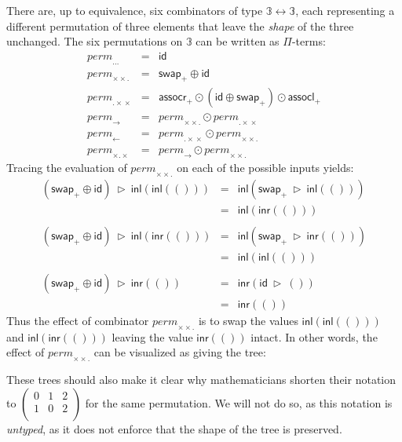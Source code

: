\documentclass[a4paper,USenglish]{lipics-v2016-utf8x}
\newcommand{\iso}{\leftrightarrow}
\newcommand{\inl}[1]{\textsf{inl}(#1)}
\newcommand{\inr}[1]{\textsf{inr}(#1)}
\newcommand{\permone}{\mathit{perm}_{...}}
\newcommand{\permtwo}{\mathit{perm}_{\times\!\times.}}
\newcommand{\permthree}{\mathit{perm}_{.\times\!\times}}
\newcommand{\permfour}{\mathit{perm}_{\rightarrow}}
\newcommand{\permfive}{\mathit{perm}_{\leftarrow}}
\newcommand{\permsix}{\mathit{perm}_{\times.\times}}
\newcommand{\evalone}[2]{#1~\triangleright~#2}
\newcommand{\unitv}{()}
\newcommand{\swapp}{\mathsf{{swap_+}}}
\newcommand{\assoclp}{\mathsf{{assocl_+}}}
\newcommand{\assocrp}{\mathsf{{assocr_+}}}
\newcommand{\idiso}{\mathsf{{id}}}
\begin{document}
There are, up to equivalence, six combinators of type
$\mathbb{3} \iso \mathbb{3}$, each representing a different
permutation of three elements that leave the \emph{shape} of the three
unchanged. The six permutations on $\mathbb{3}$ can be written as
$\Pi$-terms:
\[\begin{array}{rcl}
\permone &=& \idiso \\
\permtwo &=& \swapp \oplus \idiso \\
\permthree &=& \assocrp \odot (\idiso \oplus \swapp) \odot \assoclp \\
\permfour &=& \permtwo \odot \permthree \\
\permfive &=& \permthree \odot \permtwo \\
\permsix &=& \permfour \odot \permtwo
\end{array}\]
Tracing the evaluation of $\permtwo$ on each of the possible inputs yields:
\[\begin{array}{rcl}
\evalone{(\swapp\oplus\idiso)}{\inl{\inl{\unitv}}} &=& \inl{\evalone{\swapp}{\inl{\unitv}}} \\
&=& \inl{\inr{\unitv}} \\
\\
\evalone{(\swapp\oplus\idiso)}{\inl{\inr{\unitv}}} &=& \inl{\evalone{\swapp}{\inr{\unitv}}} \\
&=& \inl{\inl{\unitv}} \\
\\
\evalone{(\swapp\oplus\idiso)}{\inr{\unitv}} &=& \inr{\evalone{\idiso}{\unitv}} \\
&=& \inr{\unitv}
\end{array}\]
Thus the effect of combinator $\permtwo$ is to swap the values
$\inl{\inl{\unitv}}$ and $\inl{\inr{\unitv}}$ leaving the value
$\inr{\unitv}$ intact. In other words, the effect of $\permtwo$
can be visualized as giving the tree:
\begin{center}
\end{center}

These trees should also make it clear why mathematicians shorten
their notation to
$\begin{pmatrix}
0 & 1 & 2 \\
1 & 0 & 2 \\
\end{pmatrix}$
for the same permutation.  We will not do so, as this
notation is \emph{untyped}, as it does not enforce that
the shape of the tree is preserved.
\end{document}

